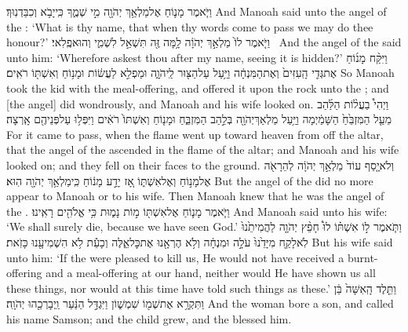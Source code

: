 {וַיֹּ֧אמֶר מָנ֛וֹחַ אֶל\maqqaf מַלְאַ֥ךְ יְהֹוָ֖ה מִ֣י שְׁמֶ֑ךָ כִּֽי\maqqaf יָבֹ֥א  וְכִבַּדְנֽוּךָ׃}
{And Manoah said unto the angel of the \lord: ‘What is thy name, that when thy words come to pass we may do thee honour?’}
{וַיֹּ֤אמֶר לוֹ֙ מַלְאַ֣ךְ יְהֹוָ֔ה לָ֥מָּה זֶּ֖ה תִּשְׁאַ֣ל לִשְׁמִ֑י וְהוּא\maqqaf פֶֽלִאי׃ \petucha }
{And the angel of the \lord\space said unto him: ‘Wherefore askest thou after my name, seeing it is hidden?’}
{וַיִּקַּ֨ח מָנ֜וֹחַ אֶת\maqqaf גְּדִ֤י הָֽעִזִּים֙ וְאֶת\maqqaf הַמִּנְחָ֔ה וַיַּ֥עַל עַל\maqqaf הַצּ֖וּר לַֽיהֹוָ֑ה וּמַפְלִ֣א לַעֲשׂ֔וֹת וּמָנ֥וֹחַ וְאִשְׁתּ֖וֹ רֹאִֽים׃}
{So Manoah took the kid with the meal-offering, and offered it upon the rock unto the \lord; and [the angel] did wondrously, and Manoah and his wife looked on.}
{וַיְהִי֩ בַעֲל֨וֹת הַלַּ֜הַב מֵעַ֤ל הַמִּזְבֵּ֙חַ֙ הַשָּׁמַ֔יְמָה וַיַּ֥עַל מַלְאַךְ\maqqaf יְהֹוָ֖ה בְּלַ֣הַב הַמִּזְבֵּ֑חַ וּמָנ֤וֹחַ וְאִשְׁתּוֹ֙ רֹאִ֔ים וַיִּפְּל֥וּ עַל\maqqaf פְּנֵיהֶ֖ם אָֽרְצָה׃}
{For it came to pass, when the flame went up toward heaven from off the altar, that the angel of the \lord\space ascended in the flame of the altar; and Manoah and his wife looked on; and they fell on their faces to the ground.}
{וְלֹא\maqqaf יָ֤סַף עוֹד֙ מַלְאַ֣ךְ יְהֹוָ֔ה לְהֵרָאֹ֖ה אֶל\maqqaf מָנ֣וֹחַ וְאֶל\maqqaf אִשְׁתּ֑וֹ אָ֚ז יָדַ֣ע מָנ֔וֹחַ כִּֽי\maqqaf מַלְאַ֥ךְ יְהֹוָ֖ה הֽוּא׃}
{But the angel of the \lord\space did no more appear to Manoah or to his wife. Then Manoah knew that he was the angel of the \lord.}
{וַיֹּ֧אמֶר מָנ֛וֹחַ אֶל\maqqaf אִשְׁתּ֖וֹ מ֣וֹת נָמ֑וּת כִּ֥י אֱלֹהִ֖ים רָאִֽינוּ׃}
{And Manoah said unto his wife: ‘We shall surely die, because we have seen God.’}
{וַתֹּ֧אמֶר ל֣וֹ אִשְׁתּ֗וֹ לוּ֩ חָפֵ֨ץ יְהֹוָ֤ה לַהֲמִיתֵ֙נוּ֙ לֹֽא\maqqaf לָקַ֤ח מִיָּדֵ֙נוּ֙ עֹלָ֣ה וּמִנְחָ֔ה וְלֹ֥א הֶרְאָ֖נוּ אֶת\maqqaf כׇּל\maqqaf אֵ֑לֶּה וְכָעֵ֕ת לֹ֥א הִשְׁמִיעָ֖נוּ כָּזֹֽאת׃}
{But his wife said unto him: ‘If the \lord\space were pleased to kill us, He would not have received a burnt-offering and a meal-offering at our hand, neither would He have shown us all these things, nor would at this time have told such things as these.’}
{וַתֵּ֤לֶד הָֽאִשָּׁה֙ בֵּ֔ן וַתִּקְרָ֥א אֶת\maqqaf שְׁמ֖וֹ שִׁמְשׁ֑וֹן וַיִּגְדַּ֣ל הַנַּ֔עַר וַֽיְבָרְכֵ֖הוּ יְהֹוָֽה׃}
{And the woman bore a son, and called his name Samson; and the child grew, and the \lord\space blessed him.}
